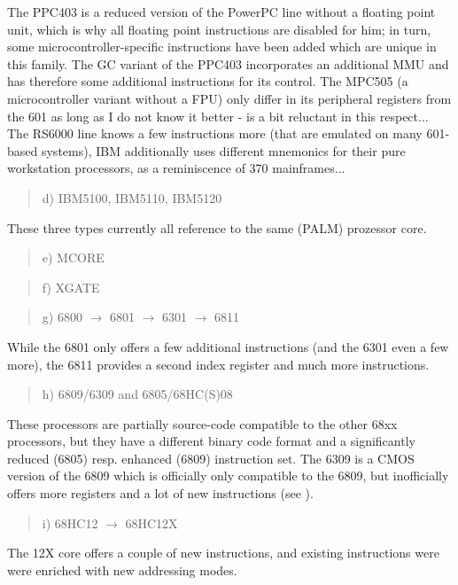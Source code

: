 \documentclass[12pt,twoside]{report}
\begin{document}
The PPC403 is a reduced version of the PowerPC line without a floating
point unit, which is why all floating point instructions are disabled for
him; in turn, some microcontroller-specific instructions have been added
which are unique in this family.  The GC variant of the PPC403
incorporates an additional MMU and has therefore some additional
instructions for its control.  The MPC505 (a microcontroller variant
without a FPU) only differ in its peripheral registers from the 601 as
long as I do not know it better - \cite{Mot505} is a bit reluctant in this
respect...  The RS6000 line knows a few instructions more (that are
emulated on many 601-based systems), IBM additionally uses different
mnemonics for their pure workstation processors, as a reminiscence of 370
mainframes...
\begin{quote}
d) IBM5100, IBM5110, IBM5120
\end{quote}
These three types currently all reference to the same (PALM)
prozessor core.
\begin{quote}
e) MCORE
\end{quote}
\begin{quote}
f) XGATE
\end{quote}
\begin{quote}
g) 6800 $\rightarrow$ 6801 $\rightarrow$ 6301 $\rightarrow$ 6811
\end{quote}
While the 6801 only offers a few additional instructions (and the
6301 even a few more), the 6811 provides a second index register and
much more instructions.
\begin{quote}
h) 6809/6309 and 6805/68HC(S)08
\end{quote}
These processors are partially source-code compatible to the other
68xx processors, but they have a different binary code format and a
significantly reduced (6805) resp. enhanced (6809) instruction set.
The 6309 is a CMOS version of the 6809 which is officially only
compatible to the 6809, but inofficially offers more registers and a
lot of new instructions (see \cite{Kaku}).
\begin{quote}
i) 68HC12 $\longrightarrow$ 68HC12X
\end{quote}
The 12X core offers a couple of new instructions, and existing
instructions were were enriched with new addressing modes.
\end{document}
